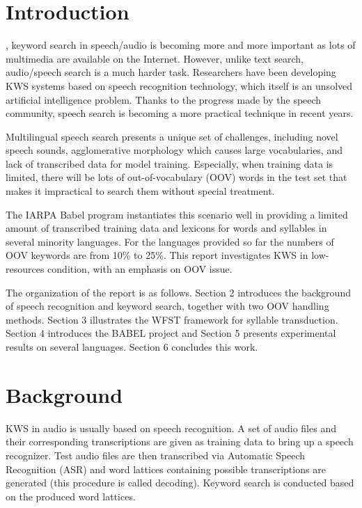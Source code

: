 \documentclass[journal]{IEEEtran}
\begin{document}
\section{Introduction}
, keyword search in speech/audio is becoming more and more important as lots of multimedia are 
available on the Internet. However, unlike text search, audio/speech search is a much harder task. Researchers 
have been developing KWS systems based on speech recognition technology, which itself is an unsolved 
artificial intelligence problem. Thanks to the progress made by the speech community, speech search is 
becoming a more practical technique in recent years.

Multilingual speech search presents a unique set of challenges, including novel speech sounds, agglomerative 
morphology which causes large vocabularies, and lack of transcribed data for model training. 
Especially, when training data is limited, there will be lots of out-of-vocabulary (OOV) words in the test 
set that makes it impractical to search them without special treatment.

The IARPA Babel program\cite{babel} instantiates this scenario well in providing a limited amount of 
transcribed training data and lexicons for words and syllables in several minority languages. For the 
languages provided so far the numbers of OOV keywords are from 10\% to 25\%. This report investigates 
KWS in low-resources condition, with an emphasis on OOV issue.

The organization of the report is as follows. Section 2 introduces the background of speech recognition and
keyword search, together with two OOV handling methods. Section 3 illustrates the WFST framework for syllable
transduction. Section 4 introduces the BABEL project and Section 5 presents experimental results on several 
languages. Section 6 concludes this work.

\section{Background}
KWS in audio is usually based on speech recognition. A set of audio files and their corresponding 
transcriptions are given as training data to bring up a speech recognizer. Test audio files are then 
transcribed via Automatic Speech Recognition (ASR) and word lattices containing possible transcriptions 
are generated (this procedure is called decoding). Keyword search is conducted based on the produced word lattices.
\end{document}
